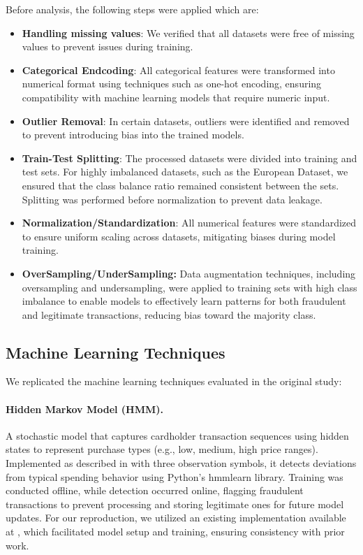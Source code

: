 \documentclass{article}
\begin{document}
Before analysis, the following steps were applied which are:
\begin{itemize}
    \item \textbf{Handling missing values}: We verified that all datasets were free of missing values to prevent issues during training.

    \item \textbf{Categorical Endcoding}: All categorical features were transformed into numerical format using techniques such as one-hot encoding, ensuring compatibility with machine learning models that require numeric input.

    \item \textbf{Outlier Removal}: In certain datasets, outliers were identified and removed to prevent introducing bias into the trained models.

    \item \textbf{Train-Test Splitting}: The processed datasets were divided into training and test sets. For highly imbalanced datasets, such as the European Dataset, we ensured that the class balance ratio remained consistent between the sets. Splitting was performed before normalization to prevent data leakage.

    \item \textbf{Normalization/Standardization}: All numerical features were standardized to ensure uniform scaling across datasets, mitigating biases during model training.

    \item \textbf{OverSampling/UnderSampling:} Data augmentation techniques, including oversampling and undersampling, were applied to training sets with high class imbalance to enable models to effectively learn patterns for both fraudulent and legitimate transactions, reducing bias toward the majority class.
\end{itemize}

\subsection{Machine Learning Techniques}
We replicated the machine learning techniques evaluated in the original study:

\paragraph{Hidden Markov Model (HMM).}
A stochastic model that captures cardholder transaction sequences using hidden states to represent purchase types (e.g., low, medium, high price ranges). Implemented as described in \cite{srivastava2008credit} with three observation symbols, it detects deviations from typical spending behavior using Python’s hmmlearn library. Training was conducted offline, while detection occurred online, flagging fraudulent transactions to prevent processing and storing legitimate ones for future model updates. For our reproduction, we utilized an existing implementation available at \cite{khamesian_credit-card-fraud-detection}, which facilitated model setup and training, ensuring consistency with prior work.
\end{document}
